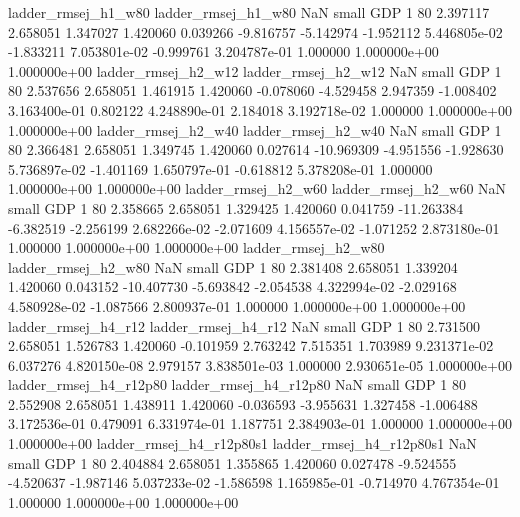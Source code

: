      ladder_rmsej_h1_w80      ladder_rmsej_h1_w80                   NaN      small      GDP                 1 80 2.397117       2.658051 1.347027       1.420060    0.039266     -9.816757     -5.142974    -1.952112   5.446805e-02 -1.833211 7.053801e-02    -0.999761   3.204787e-01            1.000000    1.000000e+00        1.000000e+00
     ladder_rmsej_h2_w12      ladder_rmsej_h2_w12                   NaN      small      GDP                 1 80 2.537656       2.658051 1.461915       1.420060   -0.078060     -4.529458      2.947359    -1.008402   3.163400e-01  0.802122 4.248890e-01     2.184018   3.192718e-02            1.000000    1.000000e+00        1.000000e+00
     ladder_rmsej_h2_w40      ladder_rmsej_h2_w40                   NaN      small      GDP                 1 80 2.366481       2.658051 1.349745       1.420060    0.027614    -10.969309     -4.951556    -1.928630   5.736897e-02 -1.401169 1.650797e-01    -0.618812   5.378208e-01            1.000000    1.000000e+00        1.000000e+00
     ladder_rmsej_h2_w60      ladder_rmsej_h2_w60                   NaN      small      GDP                 1 80 2.358665       2.658051 1.329425       1.420060    0.041759    -11.263384     -6.382519    -2.256199   2.682266e-02 -2.071609 4.156557e-02    -1.071252   2.873180e-01            1.000000    1.000000e+00        1.000000e+00
     ladder_rmsej_h2_w80      ladder_rmsej_h2_w80                   NaN      small      GDP                 1 80 2.381408       2.658051 1.339204       1.420060    0.043152    -10.407730     -5.693842    -2.054538   4.322994e-02 -2.029168 4.580928e-02    -1.087566   2.800937e-01            1.000000    1.000000e+00        1.000000e+00
     ladder_rmsej_h4_r12      ladder_rmsej_h4_r12                   NaN      small      GDP                 1 80 2.731500       2.658051 1.526783       1.420060   -0.101959      2.763242      7.515351     1.703989   9.231371e-02  6.037276 4.820150e-08     2.979157   3.838501e-03            1.000000    2.930651e-05        1.000000e+00
  ladder_rmsej_h4_r12p80   ladder_rmsej_h4_r12p80                   NaN      small      GDP                 1 80 2.552908       2.658051 1.438911       1.420060   -0.036593     -3.955631      1.327458    -1.006488   3.172536e-01  0.479091 6.331974e-01     1.187751   2.384903e-01            1.000000    1.000000e+00        1.000000e+00
ladder_rmsej_h4_r12p80s1 ladder_rmsej_h4_r12p80s1                   NaN      small      GDP                 1 80 2.404884       2.658051 1.355865       1.420060    0.027478     -9.524555     -4.520637    -1.987146   5.037233e-02 -1.586598 1.165985e-01    -0.714970   4.767354e-01            1.000000    1.000000e+00        1.000000e+00
